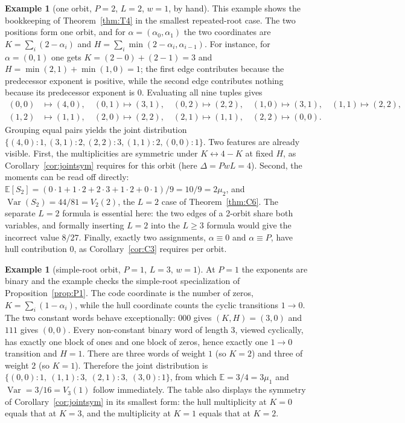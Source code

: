 \documentclass[10pt,journal,draftclsnofoot,onecolumn]{IEEEtran}
\theoremstyle{definition}
\newtheorem{example}[theorem]{Example}
\theoremstyle{remark}
\newcommand{\E}{\mathbb{E}}
\begin{document}
\begin{example}[one orbit, \(P=2\), \(L=2\), \(w=1\), by hand]
\label{ex:E1}
This example shows the bookkeeping of Theorem~\ref{thm:T4} in the
smallest repeated-root case. The two positions form one orbit, and for
\(\alpha = (\alpha_0,\alpha_1)\) the two coordinates are
\(K = \sum_i (2-\alpha_i)\) and
\(H = \sum_i \min(2-\alpha_i, \alpha_{i-1})\). For instance, for
\(\alpha = (0,1)\) one gets \(K = (2-0) + (2-1) = 3\) and
\(H = \min(2,1) + \min(1,0) = 1\); the first edge contributes because
the predecessor exponent is positive, while the second edge contributes
nothing because its predecessor exponent is \(0\). Evaluating all nine
tuples gives
\[
\begin{aligned}
(0,0)&\mapsto(4,0),\quad (0,1)\mapsto(3,1),\quad (0,2)\mapsto(2,2),\quad
(1,0)\mapsto(3,1),\quad (1,1)\mapsto(2,2),\\
(1,2)&\mapsto(1,1),\quad (2,0)\mapsto(2,2),\quad (2,1)\mapsto(1,1),\quad (2,2)\mapsto(0,0).
\end{aligned}
\]
Grouping equal pairs yields the joint distribution
\(\{(4,0):1, (3,1):2, (2,2):3, (1,1):2, (0,0):1\}\). Two features are
already visible. First, the multiplicities are symmetric under
\(K \leftrightarrow 4-K\) at fixed \(H\), as
Corollary~\ref{cor:jointsym} requires for this orbit (here
\(\Delta = PwL = 4\)). Second, the moments can be read off directly:
\(\E[S_2] = (0\cdot1 + 1\cdot2 + 2\cdot3 + 1\cdot2 + 0\cdot1)/9 =
10/9 = 2\mu_2\), and
\(\operatorname{Var}(S_2) = 44/81 = V_2(2)\), the \(L=2\) case of
Theorem~\ref{thm:C6}. The separate \(L=2\) formula is essential here:
the two edges of a 2-orbit share both variables, and formally inserting
\(L=2\) into the \(L \ge 3\) formula would give the incorrect value
\(8/27\). Finally, exactly two assignments, \(\alpha \equiv 0\) and
\(\alpha \equiv P\), have hull contribution \(0\), as
Corollary~\ref{cor:C3} requires per orbit.
\end{example}

\begin{example}[simple-root orbit, \(P=1\), \(L=3\), \(w=1\)]\label{ex:E2}
At \(P=1\) the exponents are binary and the example checks the
simple-root specialization of Proposition~\ref{prop:P1}. The code
coordinate is the number of zeros, \(K = \sum_i (1-\alpha_i)\), while
the hull coordinate counts the cyclic transitions \(1 \to 0\). The
two constant words behave exceptionally: \(000\) gives \((K,H) =
(3,0)\) and \(111\) gives \((0,0)\). Every non-constant binary word
of length \(3\), viewed cyclically, has exactly one block of ones and
one block of zeros, hence exactly one \(1 \to 0\) transition and
\(H = 1\). There are three words of weight \(1\) (so \(K=2\)) and
three of weight \(2\) (so \(K=1\)). Therefore the joint distribution
is
\(\{(0,0):1,\ (1,1):3,\ (2,1):3,\ (3,0):1\}\), from which
\(\E = 3/4 = 3\mu_1\) and
\(\operatorname{Var} = 3/16 = V_3(1)\) follow immediately. The table
also displays the symmetry of Corollary~\ref{cor:jointsym} in its
smallest form: the hull multiplicity at \(K=0\) equals that at
\(K=3\), and the multiplicity at \(K=1\) equals that at \(K=2\).
\end{example}
\end{document}
